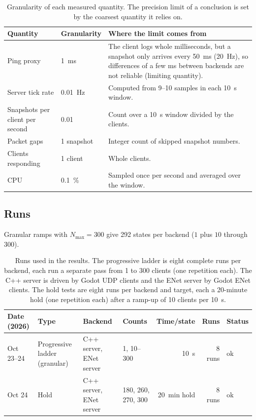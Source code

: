 \IfFileExists{IEEEtran.cls}{\ieeetrue\documentclass[conference]{IEEEtran}}{\ieeefalse\documentclass[twocolumn,10pt]{article}}
\begin{document}
\begin{table}[!t]
\caption{Granularity of each measured quantity. The precision limit of a conclusion is set by the coarsest quantity it relies on.}
\label{tab:precision}
\centering
\footnotesize
\begin{tabular}{@{}llp{6.2cm}@{}}
\toprule
Quantity & Granularity & Where the limit comes from \\
\midrule
Ping proxy & 1~ms & The client logs whole milliseconds, but a snapshot only arrives every 50~ms (20~Hz), so differences of a few ms between backends are not reliable (limiting quantity). \\
Server tick rate & 0.01~Hz & Computed from 9--10 samples in each 10~s window. \\
Snapshots per client per second & 0.01 & Count over a 10~s window divided by the clients. \\
Packet gaps & 1 snapshot & Integer count of skipped snapshot numbers. \\
Clients responding & 1 client & Whole clients. \\
CPU & 0.1~\% & Sampled once per second and averaged over the window. \\
\bottomrule
\end{tabular}
\end{table}

\subsection{Runs}

Granular ramps with $N_{\max}=300$ give 292 states per backend
($1$ plus $10$ through $300$).

\begin{table}[!t]
\caption{Runs used in the results. The progressive ladder is eight complete runs per backend, each run a separate pass from 1 to 300 clients (one repetition each). The C++ server is driven by Godot UDP clients and the ENet server by Godot ENet clients. The hold tests are eight runs per backend and target, each a 20-minute hold (one repetition each) after a ramp-up of 10 clients per 10~s.}
\centering
\footnotesize
\setlength{\tabcolsep}{3pt}
\begin{tabular}{@{}llllrrl@{}}
\toprule
Date (2026) & Type & Backend & Counts & Time/state & Runs & Status \\
\midrule
Oct 23--24 & Progressive ladder (granular) & C++ server, ENet server & 1, 10--300 & 10~s & 8 runs & ok \\
Oct 24 & Hold & C++ server, ENet server & 180, 260, 270, 300 & 20~min hold & 8 runs & ok \\
\bottomrule
\end{tabular}
\end{table}
\end{document}
